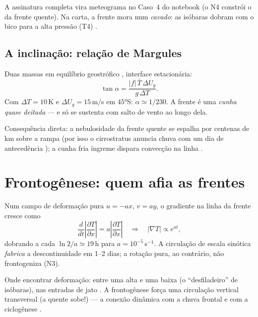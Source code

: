 \documentclass[11pt]{article}
\begin{document}
A assinatura completa vira meteograma no Caso~4 do notebook (o N4
constrói o da frente quente). Na carta, a frente mora num \emph{cavado}:
as isóbaras dobram com o bico para a alta pressão (T4)
.

\subsection{A inclinação: relação de Margules}

\begin{formadif}
Duas massas em equilíbrio geostrófico ,
interface estacionária:
\[ \tan\alpha = \frac{|f|\,\bar T\,\Delta U_g}{g\,\Delta T}. \]
Com $\Delta T = 10$\,K e $\Delta U_g = 15$\,m/s em $45°$S:
$\alpha \simeq 1/230$. A frente é uma \emph{cunha quase deitada} — e só
se sustenta com salto de vento ao longo dela.
\end{formadif}

Consequência direta: a nebulosidade da frente quente se espalha por
centenas de km sobre a rampa (por isso o cirrostratus anuncia chuva com
um dia de antecedência ); a cunha fria
íngreme dispara convecção na linha .

\section{Frontogênese: quem afia as frentes}\label{sec:fronto}


\begin{formadif}
Num campo de deformação pura $u = -ax$, $v = ay$, o gradiente na linha
da frente cresce como
\[ \frac{d}{dt}\left|\frac{\partial T}{\partial x}\right| =
a\left|\frac{\partial T}{\partial x}\right|
\quad\Rightarrow\quad |\nabla T| \propto e^{at}, \]
dobrando a cada $\ln 2/a \simeq 19$\,h para
$a = 10^{-5}$\,s$^{-1}$. A circulação de escala sinótica
\emph{fabrica} a descontinuidade em 1--2 dias; a rotação pura, ao
contrário, não frontogeniza (N3).
\end{formadif}

Onde encontrar deformação: entre uma alta e uma baixa (o ``desfiladeiro''
de isóbaras), nas entradas de jato . A frontogênese
força uma circulação vertical transversal (a quente sobe!) — a conexão
dinâmica com a chuva frontal e com a ciclogênese
.
\end{document}
